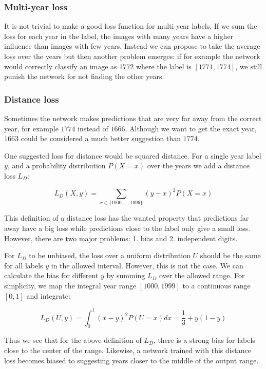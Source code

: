 \subsubsection{Multi-year loss}

It is not trivial to make a good loss function for multi-year labels. If we sum the loss for each year in the label, the images with many years have a higher influence than images with few years. Instead we can propose to take the average loss over the years but then another problem emerges: if for example the network would correctly classify an image as $1772$ where the label is $[1771, 1774]$, we still punish the network for not finding the other years.


\subsubsection{Distance loss}

Sometimes the network makes predictions that are very far away from the correct year, for example $1774$ instead of $1666$. Although we want to get the exact year, $1663$ could be considered a much better suggestion than $1774$.

One suggested loss for distance would be squared distance. For a single year label $y$, and a probability distribution $P(X=x)$ over the years we add a distance loss $L_D$:

\[
L_D(X, y) = \sum_{x \in \{1000, \ldots, 1999\}} (y-x)^2 P(X=x)
\]

This definition of a distance loss has the wanted property that predictions far away have a big loss while predictions close to the label only give a small loss. However, there are two major problems: 1. bias and 2. independent digits.

For $L_D$ to be unbiased, the loss over a uniform distribution $U$ should be the same for all labels $y$ in the allowed interval. However, this is not the case. We can calculate the bias for different $y$ by summing $L_D$ over the allowed range. For simplicity, we map the integral year range $[1000, 1999]$ to a continuous range $[0,1]$ and integrate:

\[
L_D(U, y) = \int_0^1 (x-y)^2 P(U=x) dx = \frac{1}{3} + y(1-y)
\]

Thus we see that for the above definition of $L_D$, there is a strong bias for labels close to the center of the range. Likewise, a network trained with this distance loss becomes biased to suggesting years closer to the middle of the output range.

